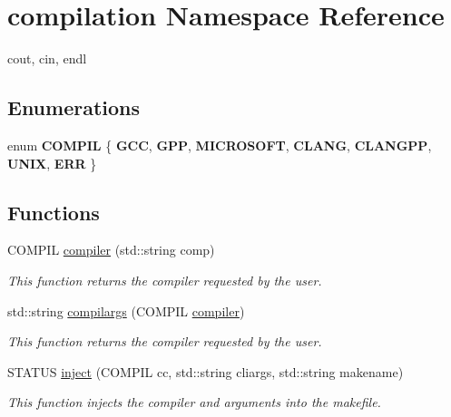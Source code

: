\hypertarget{namespacecompilation}{}\section{compilation Namespace Reference}
\label{namespacecompilation}


cout, cin, endl  


\subsection*{Enumerations}
\begin{DoxyCompactItemize}
\item 
\mbox{\label{namespacecompilation_ab8b552e73f4f5a4912982468f052f089}} 
enum {\bfseries C\+O\+M\+P\+IL} \{ \newline
{\bfseries G\+CC}, 
{\bfseries G\+PP}, 
{\bfseries M\+I\+C\+R\+O\+S\+O\+FT}, 
{\bfseries C\+L\+A\+NG}, 
\newline
{\bfseries C\+L\+A\+N\+G\+PP}, 
{\bfseries U\+N\+IX}, 
{\bfseries E\+RR}
 \}
\end{DoxyCompactItemize}
\subsection*{Functions}
\begin{DoxyCompactItemize}
\item 
C\+O\+M\+P\+IL \mbox{\hyperlink{namespacecompilation_ade0240a5a26a4d43e6bc19ff6c1b1085}{compiler}} (std\+::string comp)
\begin{DoxyCompactList}\small\item\em This function returns the compiler requested by the user. \end{DoxyCompactList}\item 
std\+::string \mbox{\hyperlink{namespacecompilation_a02be2d606b5d56c721ad17b111d53298}{compilargs}} (C\+O\+M\+P\+IL \mbox{\hyperlink{namespacecompilation_ade0240a5a26a4d43e6bc19ff6c1b1085}{compiler}})
\begin{DoxyCompactList}\small\item\em This function returns the compiler requested by the user. \end{DoxyCompactList}\item 
S\+T\+A\+T\+US \mbox{\hyperlink{namespacecompilation_a8903c2b63e13907904d398bca6d64d9f}{inject}} (C\+O\+M\+P\+IL cc, std\+::string cliargs, std\+::string makename)
\begin{DoxyCompactList}\small\item\em This function injects the compiler and arguments into the makefile. \end{DoxyCompactList}\end{DoxyCompactItemize}


